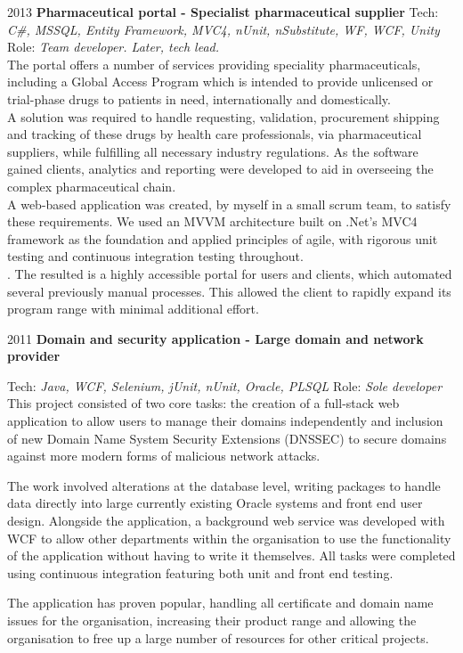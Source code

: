 \documentclass[]{friggeri-cv} %
\begin{document}
\begin{entrylist}
\entry
{2013}
{\textbf{Pharmaceutical portal - Specialist pharmaceutical supplier}}
{}
{Tech:  \emph{C\#, MSSQL, Entity Framework, MVC4, nUnit, nSubstitute, WF, WCF, Unity} \\ Role: \emph{Team developer. Later, tech lead.}\\
The portal offers a number of services providing speciality pharmaceuticals, including
a Global Access Program which is intended to provide unlicensed or trial-phase drugs
to patients in need, internationally and domestically.\\
A solution was required to handle
requesting, validation, procurement shipping and tracking of these drugs by health care
professionals, via pharmaceutical suppliers, while fulfilling all necessary industry regulations. As the software gained clients, analytics and reporting were developed
to aid in overseeing the complex pharmaceutical chain. \\
A web-based application was created, by myself in a small scrum team, to satisfy these
requirements. We used an MVVM architecture built on .Net’s MVC4 framework as the foundation and applied principles of agile, with rigorous unit testing and continuous integration testing throughout. \\
. The resulted is a highly accessible portal for users and clients, which automated several previously manual processes. This allowed the client to rapidly expand
its program range with minimal additional effort. 
}

\entry
{2011}
{\textbf{Domain and security application - Large domain and network provider}}
{}
{Tech: \emph{Java, WCF, Selenium, jUnit, nUnit, Oracle, PLSQL} \hfill Role: \emph{Sole developer} \\
This project consisted of two core tasks: the creation of a full-stack web application to allow users to manage their domains independently and inclusion of new Domain Name System Security Extensions (DNSSEC) to secure domains against more modern forms of malicious network attacks.

The work involved alterations at the database level, writing packages to handle data directly into large currently existing Oracle systems  and front end user design. Alongside the application, a background web service was developed with WCF to allow other departments within the organisation to use the functionality of the application without having to write it themselves. All tasks were completed using continuous integration featuring both unit and front end testing.

The application has proven popular, handling all certificate and domain name issues for the organisation, increasing their product range and allowing the organisation to free up a large number of resources for other critical projects.
}

\end{entrylist}
\end{document}

